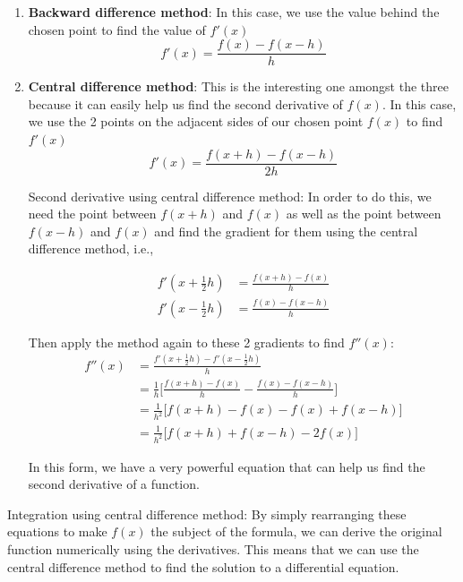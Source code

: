 \documentclass{article}
\begin{document}
\begin{enumerate}
    \item \textbf{Backward difference method}: In this case, we use the value behind the chosen point to find the value of $f'(x)$
          \begin{equation*}
              f'(x)=\frac{f(x)-f(x-h)}{h}
          \end{equation*}
    \item \textbf{Central difference method}: This is the interesting one amongst the three because it can easily help us find the second derivative of $f(x)$. In this case, we use the 2 points on the adjacent sides of our chosen point $f(x)$ to find $f'(x)$
          \begin{equation*}
              f'(x)=\frac{f(x+h)-f(x-h)}{2h}
          \end{equation*}

          Second derivative using central difference method: In order to do this, we need the point between $f(x+h)$ and $f(x)$ as well as the point between $f(x-h)$ and $f(x)$ and find the gradient for them using the central difference method, i.e.,

          \begin{align*}
              f'(x+\frac{1}{2}h) & =\frac{f(x+h)-f(x)}{h} \\
              f'(x-\frac{1}{2}h) & =\frac{f(x)-f(x-h)}{h}
          \end{align*}

          Then apply the method again to these 2 gradients to find $f''(x)$:
          \begin{align*}
              f''(x) & =\frac{f'(x+\frac{1}{2}h)-f'(x-\frac{1}{2}h)}{h}                  \\
                     & =\frac{1}{h}\Big[\frac{f(x+h)-f(x)}{h}-\frac{f(x)-f(x-h)}{h}\Big] \\
                     & =\frac{1}{h^2}\Big[f(x+h)-f(x)-f(x)+f(x-h)\Big]                   \\
                     & =\frac{1}{h^2}\Big[f(x+h)+f(x-h)-2f(x)\Big]
          \end{align*}

          In this form, we have a very powerful equation that can help us find the second derivative of a function.
\end{enumerate}

Integration using central difference method: By simply rearranging these equations to make $f(x)$ the subject of the formula, we can derive the original function numerically using the derivatives. This means that we can use the central difference method to find the solution to a differential equation.
\end{document}
